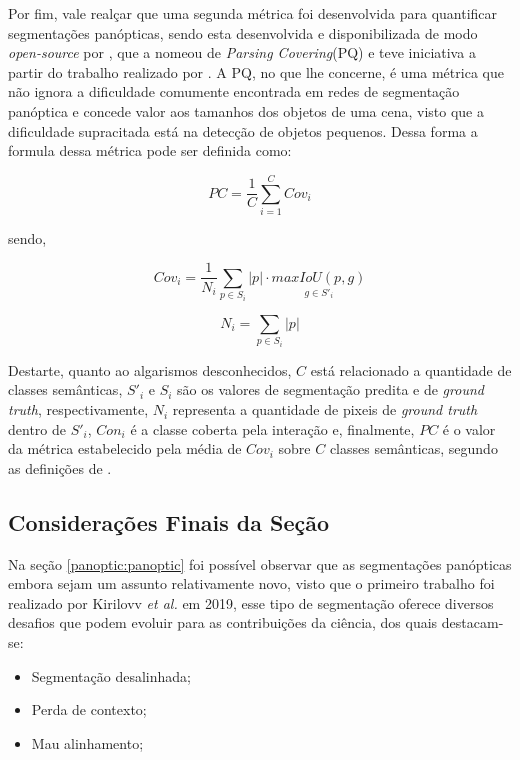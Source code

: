 Por fim, vale realçar que uma segunda métrica foi desenvolvida para quantificar segmentações panópticas, sendo esta desenvolvida e disponibilizada de modo \textit{open-source} por \cite{Yang2019DeeperLab:Parser}, que a nomeou de \textit{Parsing Covering}(PQ) e teve iniciativa a partir do trabalho realizado por \cite{Arbelaez2011ContourSegmentation}. A PQ, no que lhe concerne, é uma métrica que não ignora a dificuldade comumente encontrada em redes de segmentação panóptica e concede valor aos tamanhos dos objetos de uma cena, visto que a dificuldade supracitada está na detecção de objetos pequenos. Dessa forma a formula dessa métrica pode ser definida como:

\begin{equation}
    \label{panoptic:eq:3}
    PC = \frac{1}{C} \underset{i=1}{\overset{C}{\sum}}Cov_i
\end{equation}

sendo,

\begin{equation}
    \label{panoptic:eq:4}
    Cov_i = \frac{1}{N_i}\underset{p \in S_i}{\sum} |p|\cdot \underset{g \in S'_i}{max IoU(p,g)}
\end{equation}

\begin{equation}
    \label{panoptic:eq:5}
    N_i = \underset{p \in S_i}{\sum} |p|
\end{equation}

Destarte, quanto ao algarismos desconhecidos, $C$ está relacionado a quantidade de classes semânticas, $S'_i$ e $S_i$ são os valores de segmentação predita e de \textit{ground truth}, respectivamente, $N_i$ representa a quantidade de pixeis de \textit{ground truth} dentro de $S'_i$, $Con_i$ é a classe coberta pela interação e, finalmente, $PC$ é o valor da métrica estabelecido pela média de $Cov_i$ sobre $C$ classes semânticas, segundo as definições de \cite{Yang2019DeeperLab:Parser}.


\subsection{Considerações Finais da Seção}
\label{panoptic:conclusion}
 Na seção \ref{panoptic:panoptic} foi possível observar que as segmentações panópticas embora sejam um assunto relativamente novo, visto que o primeiro trabalho foi realizado por Kirilovv \textit{et al.} \cite{Kirillov2019a} em 2019, esse tipo de segmentação oferece diversos desafios que podem evoluir para as contribuições da ciência, dos quais destacam-se:
 \begin{itemize}
     \item Segmentação desalinhada;
     \item Perda de contexto;
     \item Mau alinhamento;
 \end{itemize}

